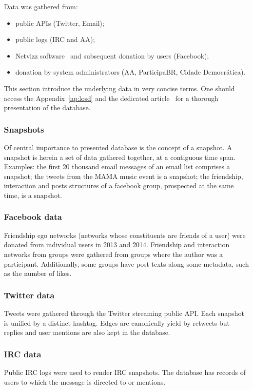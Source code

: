 Data was gathered from:
\begin{itemize}
	\item public APIs (Twitter, Email);
	\item public logs (IRC and AA);
	\item Netvizz software~\cite{netvizz} and subsequent donation by users (Facebook);
	\item donation by system administrators (AA, ParticipaBR, Cidade Democr\'atica).
\end{itemize}

This section introduce the underlying data in very concise terms.
One should access the Appendix~\ref{ap:losd} and the dedicated article~\cite{olsd} for
a thorough presentation of the database.
 
\subsubsection{Snapshots}
Of central importance to presented database is the concept of a snapshot.
A snapshot is herein a set of data gathered together,
at a contiguous time span.
Examples: the first 20 thousand email messages of an email list
comprises a snapshot; the tweets from the MAMA music event is a
snapshot; the friendship, interaction and posts structures of a facebook
group, prospected at the same time, is a snapshot.

\subsubsection{Facebook data}
Friendship ego networks (networks whose constituents are friends of a user)
were donated from individual users in 2013 and 2014.
Friendship and interaction networks from groups were gathered from
groups where the author was a participant.
Additionally, some groups have post texts along some metadata, such as
the number of likes.

\subsubsection{Twitter data}
Tweets were gathered through the Twitter streaming public API.
Each snapshot is unified by a distinct hashtag.
Edges are canonically yield by retweets but replies and user mentions
are also kept in the database.

\subsubsection{IRC data}
Public IRC logs were used to render IRC snapshots.
The database has records of users to which the message is directed to or
mentions.

